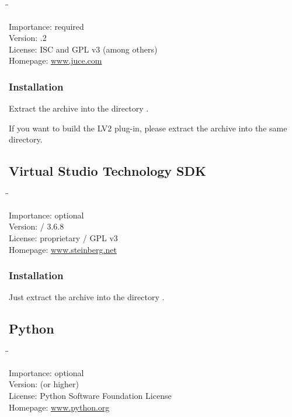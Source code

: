 \begin{tabbing}
  \hspace*{6em}\=\=\kill

  Importance:  \> required \\
  Version:     .2 \\
  License:     \> ISC and GPL v3 (among others) \\
  Homepage:    \> \href{http://www.juce.com/}{www.juce.com}
\end{tabbing}

\subsubsection{Installation}

Extract the archive into the directory .

If you want to build the LV2 plug-in, please extract the archive
 into the same directory.

\subsection{Virtual Studio Technology SDK}

\begin{tabbing}
  \hspace*{6em}\=\=\kill

  Importance:  \> optional \\
  Version:      / 3.6.8 \\
  License:     \> proprietary / GPL v3 \\
  Homepage:    \> \href{http://www.steinberg.net/en/company/developer.html}{www.steinberg.net}
\end{tabbing}

\subsubsection{Installation}

Just extract the archive into the directory .

\subsection{Python}

\begin{tabbing}
  \hspace*{6em}\=\=\kill

  Importance:  \> optional \\
  Version:      (or higher) \\
  License:     \> Python Software Foundation License \\
  Homepage:    \> \href{http://www.python.org/}{www.python.org}
\end{tabbing}

